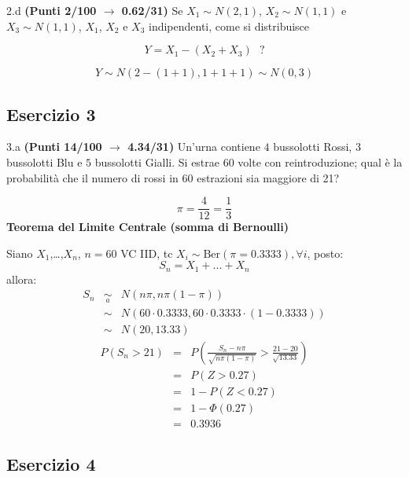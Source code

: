 \documentclass[
  11pt,
]{book}
\theoremstyle{mytheoremstyle}
\theoremstyle{mydefstyle}
\newenvironment{sol}
  {
  \begin{tcolorbox}[enhanced,breakable,arc=0.1mm,boxrule=1pt,colback=white,colframe=iblue,
  title=\bf \fontfamily{lmss}\selectfont \hspace{.5 cm} Soluzione,drop fuzzy shadow]

}{
\end{tcolorbox}
  }
\begin{document}
2.d \textbf{(Punti 2/100 \(\rightarrow\) 0.62/31)} Se \(X_1\sim N(2,1)\), \(X_2\sim N(1,1)\) e \(X_3\sim N(1,1)\),
\(X_1\), \(X_2\) e \(X_3\) indipendenti, come si distribuisce

\[
  Y=X_1-(X_2+X_3) ~~~?
\]

\begin{sol}
\[Y\sim N(2-(1+1),1+1+1)\sim N(0,3)\]

\end{sol}

\subsection{Esercizio 3}\label{esercizio-3-2}

3.a \textbf{(Punti 14/100 \(\rightarrow\) 4.34/31)} Un'urna contiene \(4\) bussolotti Rossi, \(3\) bussolotti Blu e \(5\) bussolotti Gialli. Si estrae 60 volte con reintroduzione; qual è la probabilità che il numero di rossi in 60 estrazioni sia maggiore di 21?

\begin{sol}
\[\pi=\frac 4{12}=\frac 13\]
\textbf{Teorema del Limite Centrale (somma di Bernoulli)}

Siano \(X_1\),\ldots,\(X_n\), \(n=60\) VC IID, tc \(X_i\sim\text{Ber}(\pi=0.3333)\)\(,\forall i\), posto:
\[
      S_n = X_1 + ... + X_n
      \]
allora:\begin{eqnarray*}
  S_n & \mathop{\sim}\limits_{a}& N(n\pi,n\pi(1-\pi)) \\
      &\sim & N(60\cdot0.3333,60\cdot0.3333\cdot(1-0.3333)) \\
      &\sim & N(20,13.33)
  \end{eqnarray*}\begin{eqnarray*}
      P( S_n   >   21 ) 
        &=& P\left(  \frac { S_n  -  n\pi }{ \sqrt{n\pi(1-\pi)} }  >  \frac { 21  -  20 }{\sqrt{ 13.33 }} \right)  \\
                 &=& P\left(  Z   >   0.27 \right) \\    &=& 1-P(Z< 0.27 )\\ 
                 &=&  1-\Phi( 0.27 ) \\ &=&  0.3936 
      \end{eqnarray*}

\end{sol}

\subsection{Esercizio 4}\label{esercizio-4-2}
\end{document}
